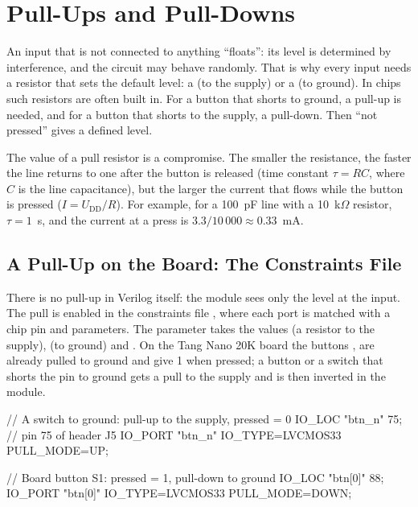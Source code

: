 \section{Pull-Ups and Pull-Downs}

An input that is not connected to anything ``floats'': its level is determined by
interference, and the circuit may behave randomly. That is why every input needs a
resistor that sets the default level: a  (to the supply)
or a  (to ground). In chips such resistors are
often built in. For a button that shorts to ground, a pull-up is needed, and
for a button that shorts to the supply, a pull-down. Then ``not pressed'' gives a
defined level.

The value of a pull resistor is a compromise. The smaller the resistance, the faster the
line returns to one after the button is released (time constant
$\tau = RC$, where $C$ is the line capacitance), but the larger the current that flows while the
button is pressed ($I = U_\text{DD}/R$). For example, for a 100~pF line with a
10~k$\Omega$ resistor, $\tau = 1$~\textmu s, and the current at a press is $3.3/10\,000 \approx
0.33$~mA.

\subsection{A Pull-Up on the Board: The Constraints File}

There is no pull-up in Verilog itself: the module sees only the level at the
input. The pull is enabled in the constraints file , where each port
is matched with a chip pin and parameters. The parameter  takes
the values  (a resistor to the supply),  (to ground) and
. On the Tang Nano 20K board the buttons ,  are
already pulled to ground and give 1 when pressed; a button or a switch that
shorts the pin to ground gets a pull to the supply and is then inverted in the
module.


\begin{vcode}[text]
// A switch to ground: pull-up to the supply, pressed = 0
IO_LOC  "btn_n" 75;                          // pin 75 of header J5
IO_PORT "btn_n" IO_TYPE=LVCMOS33 PULL_MODE=UP;

// Board button S1: pressed = 1, pull-down to ground
IO_LOC  "btn[0]" 88;
IO_PORT "btn[0]" IO_TYPE=LVCMOS33 PULL_MODE=DOWN;
\end{vcode}

